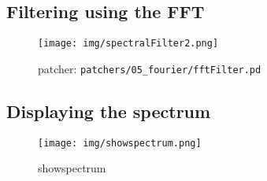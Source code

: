 \subsection{Filtering using the FFT}
\begin{figure}[h]
	\begin{center}
		\texttt{[image: img/spectralFilter2.png]}
		\caption{patcher: \texttt{patchers/05\_fourier/fftFilter.pd}}
		\label{fig:spectralFilter}
	\end{center}
\end{figure}
\subsection{Displaying the spectrum}
\begin{figure}[h]
	\begin{center}
		\texttt{[image: img/showspectrum.png]}
		\caption{showspectrum}
		\label{fig:showspectrum}
	\end{center}
\end{figure}


